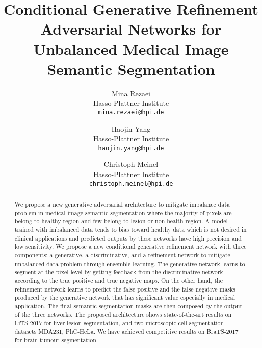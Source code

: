 \documentclass[10pt,twocolumn,letterpaper]{article}
\begin{document}
\title{Conditional Generative Refinement Adversarial Networks for Unbalanced Medical Image Semantic Segmentation}

\author{Mina Rezaei \\
Hasso-Plattner Institute\\
{\tt\small mina.rezaei@hpi.de}
\and
Haojin Yang \\
Hasso-Plattner Institute\\
{\tt\small haojin.yang@hpi.de}
\and
Christoph Meinel \\
Hasso-Plattner Institute\\
{\tt\small christoph.meinel@hpi.de}
}

\maketitle
\ifwacvfinal\thispagestyle{empty}\fi

\begin{abstract}
We propose a new generative adversarial architecture to mitigate imbalance data problem in medical image semantic segmentation where the majority of pixels are belong to healthy region and few belong to lesion or non-health region. A model trained with imbalanced data tends to bias toward healthy data which is not desired in clinical applications and predicted outputs by these networks have high precision and low sensitivity. We propose a new conditional generative refinement network with three components: a generative, a discriminative, and a refinement network to mitigate unbalanced data problem through ensemble learning. The generative network learns to segment at the pixel level by getting feedback from the discriminative network according to the true positive and true negative maps. On the other hand, the refinement network learns to predict the false positive and the false negative masks produced by the generative network that has significant value especially in medical application. The final semantic segmentation masks are then composed by the output of the three networks. The proposed architecture shows state-of-the-art results on LiTS-2017 for liver lesion segmentation, and two microscopic cell segmentation datasets MDA231, PhC-HeLa. We have achieved competitive results on BraTS-2017 for brain tumour segmentation.
\end{abstract}
\end{document}

